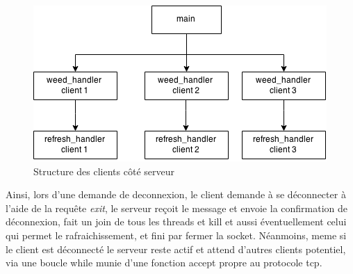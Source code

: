\begin{figure}[!h]
\caption{\label{handlers} Structure des clients côté serveur}
\begin{center}\includegraphics[scale=0.8]{thread}\end{center}
\end{figure}


Ainsi, lors d'une demande de deconnexion, le client demande à se déconnecter à l'aide de la requête \textit{exit},
le serveur reçoit le message et envoie la confirmation de déconnexion, fait un join de tous les threads et kill
et aussi éventuellement celui qui permet le rafraichissement, et fini par fermer la socket.
Néanmoins, meme si le client est déconnecté le serveur reste actif et attend d'autres clients potentiel,
via une boucle while munie d'une fonction accept propre au protocole tcp.
